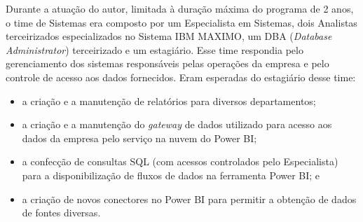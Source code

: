 Durante a atuação do autor, limitada à duração máxima do programa de 2 anos, o time de Sistemas era composto por um Especialista em Sistemas, dois Analistas terceirizados especializados no Sistema IBM MAXIMO, um DBA (\textit{Database Administrator}) terceirizado e um estagiário. Esse time respondia pelo gerenciamento dos sistemas responsáveis pelas operações da empresa e pelo controle de acesso aos dados fornecidos. 
Eram esperadas do estagiário desse time: 
\begin{itemize}
	\item a criação  e a manutenção de relatórios para diversos departamentos;
	\item  a criação e a manutenção do \textit{gateway} de dados utilizado para acesso aos dados da empresa pelo serviço na nuvem do Power BI;
	\item a confecção de consultas SQL (com acessos controlados pelo Especialista)  para a disponibilização de fluxos de dados na ferramenta Power BI; e
	\item a criação de novos conectores no Power BI para permitir a obtenção de dados de fontes diversas.
\end{itemize} 